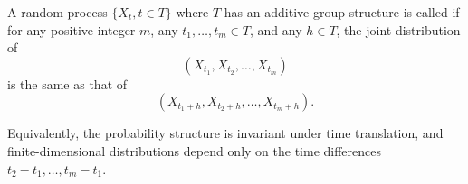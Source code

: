 A random process $\{X_t, t \in T\}$ where $T$ has an additive group structure is called  if for any positive integer $m$, any $t_1, \ldots, t_m \in T$, and any $h \in T$, the joint distribution of
$$(X_{t_1}, X_{t_2}, \ldots, X_{t_m})$$
is the same as that of
$$(X_{t_1+h}, X_{t_2+h}, \ldots, X_{t_m+h}).$$

Equivalently, the probability structure is invariant under time translation, and finite-dimensional distributions depend only on the time differences $t_2 - t_1, \ldots, t_m - t_1$.
